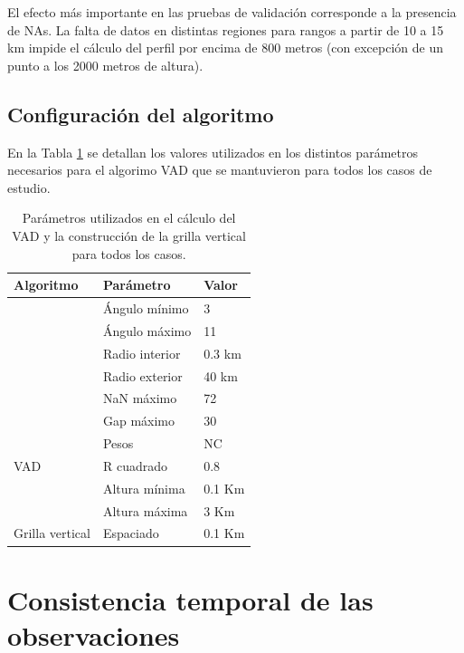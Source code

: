 \documentclass[12pt,spanish,oneside]{book}
\begin{document}
El efecto más importante en las pruebas de validación corresponde a la
presencia de NAs. La falta de datos en distintas regiones para rangos a
partir de 10 a 15 km impide el cálculo del perfil por encima de 800
metros (con excepción de un punto a los 2000 metros de altura).

\subsection{Configuración del
algoritmo}\label{configuracion-del-algoritmo}

En la Tabla \ref{parametros} se detallan los valores utilizados en los
distintos parámetros necesarios para el algorimo VAD que se mantuvieron
para todos los casos de estudio.

\begin{table}

\caption{\label{tab:parametros}Parámetros utilizados en el cálculo del VAD y la construcción de la grilla vertical para todos los casos. \label{parametros}}
\centering
\begin{tabular}[t]{lll}
\toprule
Algoritmo & Parámetro & Valor\\
\midrule
 & Ángulo mínimo & 3\\
\cmidrule{2-3}
 & Ángulo máximo & 11\\
\cmidrule{2-3}
 & Radio interior & 0.3 km\\
\cmidrule{2-3}
 & Radio exterior & 40 km\\
\cmidrule{2-3}
 & NaN máximo & 72\\
\cmidrule{2-3}
 & Gap máximo & 30\\
\cmidrule{2-3}
 & Pesos & NC\\
\cmidrule{2-3}
\multirow{-8}{*}{\raggedright\arraybackslash VAD} & R cuadrado & 0.8\\
\cmidrule{1-3}
 & Altura mínima & 0.1 Km\\
\cmidrule{2-3}
 & Altura máxima & 3 Km\\
\cmidrule{2-3}
\multirow{-3}{*}{\raggedright\arraybackslash Grilla vertical} & Espaciado & 0.1 Km\\
\bottomrule
\end{tabular}
\end{table}

\section{Consistencia temporal de las
observaciones}\label{consistencia-temporal-de-las-observaciones}
\end{document}
